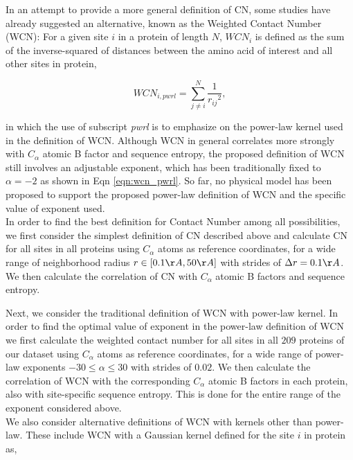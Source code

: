 \documentclass[11pt]{article}
\begin{document}
        In an attempt to provide a more general definition of CN, some studies have already suggested an alternative, known as the Weighted Contact Number (WCN): For a given site $i$ in a protein of length $N$, $WCN_i$ is defined as the sum of the inverse-squared of distances between the amino acid of interest and all other sites in protein,

        \begin{equation}
            \label{eqn:wcn_pwrl}
            WCN_{i,pwrl} = \sum^N_{j\neq i} \frac{1}{{r_{ij}}^{2}},
        \end{equation}

        in which the use of subscript {\it pwrl} is to emphasize on the power-law kernel used in the definition of WCN. Although WCN in general correlates more strongly with $C_\alpha$ atomic B factor and sequence entropy, the proposed definition of WCN still involves an adjustable exponent, which has been traditionally fixed to $\alpha=-2$ as shown in Eqn \ref{eqn:wcn_pwrl}. So far, no physical model has been proposed to support the proposed power-law definition of WCN and the specific value of exponent used. \\

        In order to find the best definition for Contact Number among all possibilities, we first consider the simplest definition of CN described above and calculate CN for all sites in all proteins using $C_\alpha$ atoms as reference coordinates, for a wide range of neighborhood radius $r\in[0.1\AA,50\AA]$ with strides of $\Delta r=0.1\AA$. We then calculate the correlation of CN with $C_\alpha$ atomic B factors and sequence entropy.

        Next, we consider the traditional definition of WCN with power-law kernel. In order to find the optimal value of exponent in the power-law definition of WCN we first calculate the weighted contact number for all sites in all $209$ proteins of our dataset using $C_\alpha$ atoms as reference coordinates, for a wide range of power-law exponents $-30\leq\alpha\leq30$ with strides of $0.02$. We then calculate the correlation of WCN with the corresponding $C_\alpha$ atomic B factors in each protein, also with site-specific sequence entropy. This is done for the entire range of the exponent considered above. \\

        We also consider alternative definitions of WCN with kernels other than power-law. These include WCN with a Gaussian kernel defined for the site $i$ in protein as,
\end{document}
